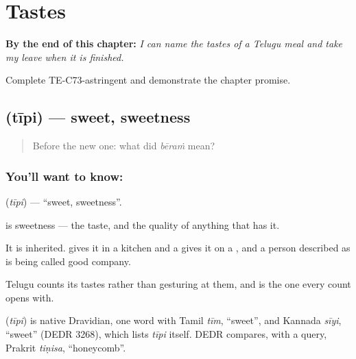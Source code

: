 
\chapter{Tastes}
\label{ch:te-tastes}

\begin{chapteropening}
\textbf{By the end of this chapter:} \emph{I can name the tastes of a Telugu meal and take my leave when it is finished.}

Complete TE-C73-astringent and demonstrate the chapter promise.
\end{chapteropening}

\section[\texorpdfstring{\te{తీపి} (tīpi)}{తీపి (tīpi)}]{ (tīpi) — sweet, sweetness}

\label{lesson:TE-C73-sweet}



\begin{quote}
Before the new one: what did \emph{bēraṁ} mean?
\end{quote}

\subsection*{You'll want to know: }
\textbf{} (\emph{tīpi}) — \textquotedblleft{}sweet, sweetness\textquotedblright{}.

 is sweetness — the taste, and the quality of anything that has it.

It is inherited.  gives it in a kitchen and a  gives it on a , and a person described as  is being called good company.

Telugu counts its tastes rather than gesturing at them, and  is the one every count opens with.

\begin{cousinweb}
\textbf{} (\emph{tīpi}) is native Dravidian, one word with Tamil \emph{tīm}, \textquotedblleft{}sweet\textquotedblright{}, and Kannada \emph{sīyi}, \textquotedblleft{}sweet\textquotedblright{} (DEDR 3268), which lists \emph{tīpi} itself. DEDR compares, with a query, Prakrit \emph{tiṇisa}, \textquotedblleft{}honeycomb\textquotedblright{}.
\end{cousinweb}

